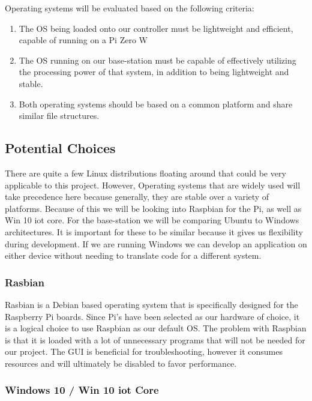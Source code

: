 \documentclass[letterpaper, 10, draftclsnofoot, onecolumn, compsoc]{IEEEtran}
\begin{document}
Operating systems will be evaluated based on the following criteria:
\begin{enumerate}
\item{The OS being loaded onto our controller must be lightweight 
and efficient, capable of running on a Pi Zero W}

\item{The OS running on our base-station must be capable of 
effectively utilizing the processing power of that system, in 
addition to being lightweight and stable.}

\item{Both operating systems should be based on a common platform 
and share similar file structures.}
\end{enumerate}

\subsection{Potential Choices}

There are quite a few Linux distributions floating around that 
could be very applicable to this project. However, Operating 
systems that are widely used will take precedence here because 
generally, they are stable over a variety of platforms. Because of 
this we will be looking into Raspbian for the Pi, as well as Win 10 
iot core. For the base-station we will be comparing Ubuntu to 
Windows architectures. It is important for these to be similar 
because it gives us flexibility during development. If we are 
running Windows we can develop an application on either device 
without needing to translate code for a different system.

\subsubsection{Rasbian}

Rasbian\cite{r5} is a Debian based operating system that is specifically 
designed for the Raspberry Pi boards. Since Pi's have been selected 
as our hardware of choice, it is a logical choice to use Raspbian as 
our default OS. The problem with Raspbian is that it is loaded with 
a lot of unnecessary programs that will not be needed for our 
project. The GUI is beneficial for troubleshooting, however it 
consumes resources and will ultimately be disabled to favor 
performance. 


\subsubsection{Windows 10 / Win 10 iot Core}
\end{document}
